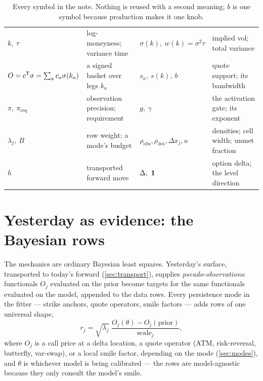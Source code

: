 \documentclass[11pt]{article}
\begin{document}
\begin{table}[H]
\centering\footnotesize
\setlength{\tabcolsep}{3pt}
\begin{tabular}{@{}llll@{}}
\toprule
$k,\ \tau$ & log-moneyness; variance time &
$\sigma(k),\ w(k)=\sigma^2\tau$ & implied vol; total variance\\[2pt]
$O=c^{\mathsf{T}}\sigma=\sum_a c_a\sigma(k_a)$ & a signed basket over legs $k_a$ &
$s_a,\ s(k),\ b$ & quote support; its bandwidth\\[2pt]
$\pi,\ \pi_{\mathrm{req}}$ & observation precision; requirement &
$g,\ \gamma$ & the activation gate; its exponent\\[2pt]
$\lambda_j,\ B$ & row weight; a mode's budget &
$\rho_{\mathrm{obs}},\rho_{\mathrm{des}},\Delta x_j,u$ & densities;
cell width; unmet fraction\\[2pt]
$h$ & transported forward move &
$\Delta,\ \1$ & option delta; the level direction\\
\bottomrule
\end{tabular}
\caption{Every symbol in the note.  Nothing is reused with a second
meaning; $b$ is one symbol because production makes it one knob.}
\label{tab:ledger}
\end{table}

\section{Yesterday as evidence: the Bayesian rows}
\label{sec:rows}

The mechanics are ordinary Bayesian least squares.  Yesterday's
surface, transported to today's forward (\cref{sec:transport}),
supplies \emph{pseudo-observations}: functionals $O_j$ evaluated on
the prior become targets for the same functionals evaluated on the
model, appended to the data rows.  Every persistence mode in the
fitter --- strike anchors, quote operators, smile factors --- adds
rows of one universal shape,
\begin{equation}
\boxed{\;r_j=\sqrt{\lambda_j}\;
\frac{O_j(\theta)-O_j(\text{prior})}{\text{scale}_j},\;}
\label{eq:universal}
\end{equation}
where $O_j$ is a call price at a delta location, a quote operator
(ATM, risk-reversal, butterfly, var-swap), or a local smile factor,
depending on the mode (\cref{sec:modes}), and $\theta$ is whichever
model is being calibrated --- the rows are model-agnostic because they
only consult the model's smile.
\end{document}
